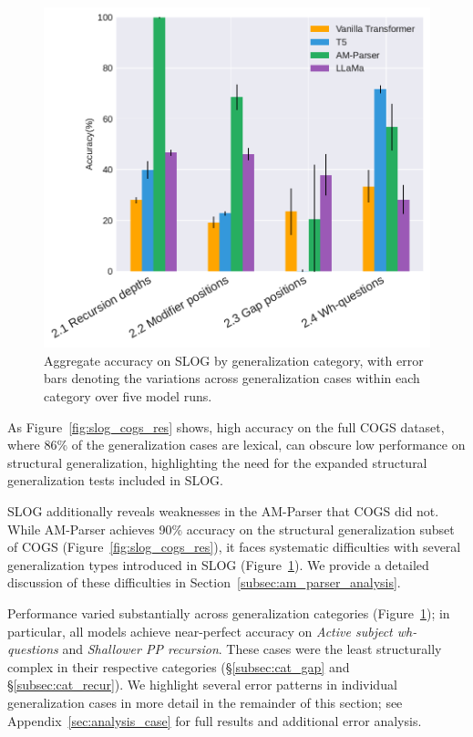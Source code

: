 \begin{figure}[H]
  \centering
  \vspace{-3mm} 
    \includegraphics[scale=0.85]{figures/res_accuracy_category.pdf}
    \vspace{-1mm} 
    \caption{Aggregate accuracy on SLOG by generalization category, with error bars denoting the variations across generalization cases within each category over five model runs.}
    \label{fig:res_category}
    \vspace{-3mm} 
\end{figure}
 

As Figure~\ref{fig:slog_cogs_res} shows, high accuracy on the full COGS dataset, where 86\% of the generalization cases are lexical, can obscure low performance on structural generalization, highlighting the need for the expanded structural generalization tests included in SLOG.

SLOG additionally reveals weaknesses in the AM-Parser that COGS did not. While AM-Parser achieves 90\% accuracy on the structural generalization subset of COGS (Figure~\ref{fig:slog_cogs_res}), it faces systematic difficulties with several generalization types introduced in SLOG (Figure~\ref{fig:res_category}). We provide a detailed discussion of these difficulties in Section~\ref{subsec:am_parser_analysis}. 


Performance varied substantially across generalization categories (Figure~\ref{fig:res_category}); in particular, all models achieve near-perfect accuracy on \textit{Active subject wh-questions} and \textit{Shallower PP recursion}. These cases were the least structurally complex in their respective categories (\S\ref{subsec:cat_gap} and \S\ref{subsec:cat_recur}). 
We highlight several error patterns in individual generalization cases in more detail in the remainder of this section; see Appendix~\ref{sec:analysis_case} for full results and additional error analysis.


